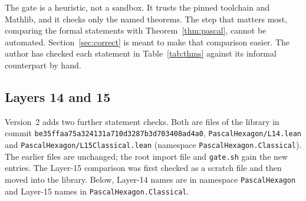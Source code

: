 \documentclass[11pt]{article}
\theoremstyle{remark}
\newcommand{\lean}[1]{\texttt{#1}}
\begin{document}
The gate is a heuristic, not a sandbox. It trusts the pinned toolchain and Mathlib, and it checks
only the named theorems. The step that matters most, comparing the formal statements with
Theorem~\ref{thm:pascal}, cannot be automated. Section~\ref{sec:correct} is meant to make that
comparison easier. The author has checked each statement in Table~\ref{tab:thms} against its
informal counterpart by hand.

\subsection{Layers 14 and 15}\label{sec:l1415}

Version~2 adds two further statement checks. Both are files of the library in commit
\texttt{be35ffaa75a324131a710d3287b3d703408ad4a0}, \lean{PascalHexagon/L14.lean} and \lean{PascalHexagon/L15Classical.lean}
(namespace \lean{PascalHexagon.Classical}). The earlier files are unchanged; the root import file and
\texttt{gate.sh} gain the new entries. The Layer-15 comparison was first checked as a scratch file
and then moved into the library. Below, Layer-14 names are in namespace
\lean{PascalHexagon} and Layer-15 names in \lean{PascalHexagon.Classical}.
\end{document}
